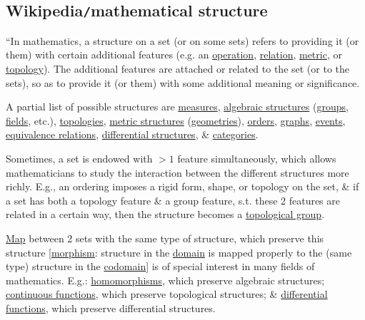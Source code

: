 \documentclass{article}
\begin{document}

\subsection{Wikipedia{\tt/}mathematical structure}
``In mathematics, a structure on a set (or on some sets) refers to providing it (or them) with certain additional features (e.g. an \href{https://en.wikipedia.org/wiki/Operation_(mathematics)}{operation}, \href{https://en.wikipedia.org/wiki/Relation_(mathematics)}{relation}, \href{https://en.wikipedia.org/wiki/Metric_(mathematics)}{metric}, or \href{https://en.wikipedia.org/wiki/Topological_space}{topology}). The additional features are attached or related to the set (or to the sets), so as to provide it (or them) with some additional meaning or significance.

A partial list of possible structures are \href{https://en.wikipedia.org/wiki/Measure_theory}{measures}, \href{https://en.wikipedia.org/wiki/Algebraic_structure}{algebraic structures} (\href{https://en.wikipedia.org/wiki/Group_(mathematics)}{groups}, \href{https://en.wikipedia.org/wiki/Field_(mathematics)}{fields}, etc.), \href{https://en.wikipedia.org/wiki/Topology}{topologies}, \href{https://en.wikipedia.org/wiki/Metric_space}{metric structures} (\href{https://en.wikipedia.org/wiki/Geometry}{geometries}), \href{https://en.wikipedia.org/wiki/Order_theory}{orders}, \href{https://en.wikipedia.org/wiki/Graph_theory}{graphs}, \href{https://en.wikipedia.org/wiki/Event_structure}{events}, \href{https://en.wikipedia.org/wiki/Equivalence_relation}{equivalence relations}, \href{https://en.wikipedia.org/wiki/Differential_structure}{differential structures}, \& \href{https://en.wikipedia.org/wiki/Category_(mathematics)}{categories}.

Sometimes, a set is endowed with $> 1$ feature simultaneously, which allows mathematicians to study the interaction between the different structures more richly. E.g., an ordering imposes a rigid form, shape, or topology on the set, \& if a set has both a topology feature \& a group feature, s.t. these 2 features are related in a certain way, then the structure becomes a \href{https://en.wikipedia.org/wiki/Topological_group}{topological group}.

\href{https://en.wikipedia.org/wiki/Map_(mathematics)}{Map} between 2 sets with the same type of structure, which preserve this structure [\href{https://en.wikipedia.org/wiki/Morphism}{morphism}: structure in the \href{https://en.wikipedia.org/wiki/Domain_of_a_function}{domain} is mapped properly to the (same type) structure in the \href{https://en.wikipedia.org/wiki/Codomain}{codomain}] is of special interest in many fields of mathematics. E.g.: \href{https://en.wikipedia.org/wiki/Homomorphisms}{homomorphisms}, which preserve algebraic structures; \href{https://en.wikipedia.org/wiki/Continuous_functions}{continuous functions}, which preserve topological structures; \& \href{https://en.wikipedia.org/wiki/Differentiable_functions}{differential functions}, which preserve differential structures.
\end{document}

